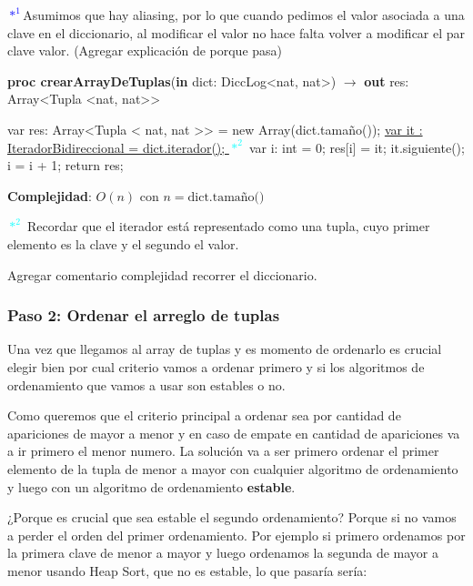 \documentclass{article}
\newcommand{\Complexity}[1]{\textbf{Complejidad}: #1}
\begin{document}
\label{sec:explanation1}
\textcolor{blue}{$*^{1}$}Asumimos que hay aliasing, por lo que cuando pedimos el valor asociada a una clave en el diccionario, al modificar el valor no hace falta volver a modificar el par clave valor. (Agregar explicación de porque pasa)
\begin{algorithm}[H]
    \caption{
        \textbf{proc crearArrayDeTuplas}(\textbf{in} dict: \textnormal{DiccLog\textless{}nat, nat\textgreater{}}) $\to$ \textbf{out} res: \textnormal{Array\textless{}Tupla \textless{}nat, nat\textgreater{}\textgreater{}}
    }
    \begin{algorithmic}[1]
        \State var res: Array\textless{}Tupla \textless{} nat, nat \textgreater{}\textgreater{} = new Array(dict.tamaño()); 
        \State \hyperref[sec:explanation2] {var it : IteradorBidireccional = dict.iterador(); \textcolor{cyan}{$*^{2}$}}  
        \State var i: int = 0;
         
            \State res[i] = it; 
            \State it.siguiente(); 
            \State i = i + 1;
        \EndWhile
        \State return res;
    \end{algorithmic}
    \Complexity{$O(n) \text{ con } n = \text{dict.tamaño()}$}
\end{algorithm}
\label{sec:explanation1}

\textcolor{cyan}{$*^{2}$} Recordar que el iterador está representado como una tupla, cuyo primer elemento es la clave y el segundo el valor.

Agregar comentario complejidad recorrer el diccionario.

\subsubsection*{Paso 2: Ordenar el arreglo de tuplas}
Una vez que llegamos al array de tuplas y es momento de ordenarlo es crucial elegir bien por cual criterio vamos a ordenar primero y si los algoritmos de ordenamiento que vamos a usar son estables o no.


Como queremos que el criterio principal a ordenar sea por cantidad de apariciones de mayor a menor y en caso de empate en cantidad de apariciones va a ir primero el menor numero. La solución va a ser primero ordenar el primer elemento de la tupla de menor a mayor con cualquier algoritmo de ordenamiento y luego con un algoritmo de ordenamiento \textbf{estable}.

¿Porque es crucial que sea estable el segundo ordenamiento? Porque si no vamos a perder el orden del primer ordenamiento. Por ejemplo si primero ordenamos por la primera clave de menor a mayor y luego ordenamos la segunda de mayor a menor usando Heap Sort, que no es estable, lo que pasaría sería:
\end{document}
